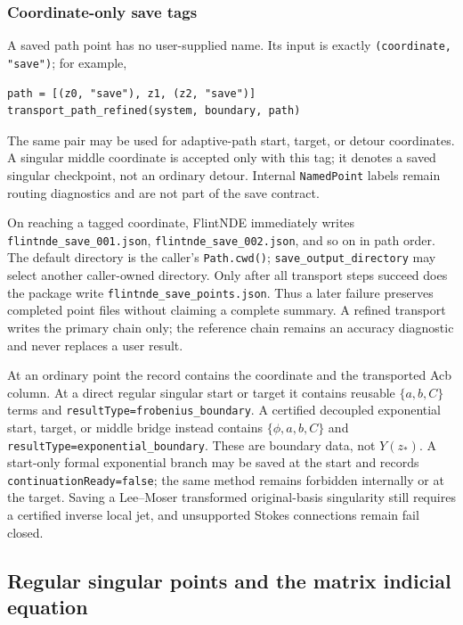\documentclass[11pt]{article}
\begin{document}
\subsubsection{Coordinate-only save tags}

A saved path point has no user-supplied name.  Its input is exactly
\texttt{(coordinate, "save")}; for example,
\begin{verbatim}
path = [(z0, "save"), z1, (z2, "save")]
transport_path_refined(system, boundary, path)
\end{verbatim}
The same pair may be used for adaptive-path start, target, or detour coordinates.  A singular
middle coordinate is accepted only with this tag; it denotes a saved singular checkpoint,
not an ordinary detour.  Internal \texttt{NamedPoint} labels remain routing diagnostics and
are not part of the save contract.

On reaching a tagged coordinate, FlintNDE immediately writes
\texttt{flintnde\_save\_001.json}, \texttt{flintnde\_save\_002.json}, and so on in path
order.  The default directory is the caller's \texttt{Path.cwd()};
\texttt{save\_output\_directory} may select another caller-owned directory.  Only after all
transport steps succeed does the package write \texttt{flintnde\_save\_points.json}.  Thus a
later failure preserves completed point files without claiming a complete summary.  A
refined transport writes the primary chain only; the reference chain remains an accuracy
diagnostic and never replaces a user result.

At an ordinary point the record contains the coordinate and the transported Acb column.  At
a direct regular singular start or target it contains reusable $\{a,b,C\}$ terms and
\texttt{resultType=frobenius\_boundary}.  A certified decoupled exponential start, target, or
middle bridge instead contains $\{\phi,a,b,C\}$ and
\texttt{resultType=exponential\_boundary}.  These are boundary data, not $Y(z_*)$.
A start-only formal exponential branch may be saved at the start and records
\texttt{continuationReady=false}; the same method remains forbidden internally or at the
target.  Saving a Lee--Moser transformed original-basis singularity still requires a
certified inverse local jet, and unsupported Stokes connections remain fail closed.

\subsection{Regular singular points and the matrix indicial equation}
\label{subsec:frobenius}
\end{document}
